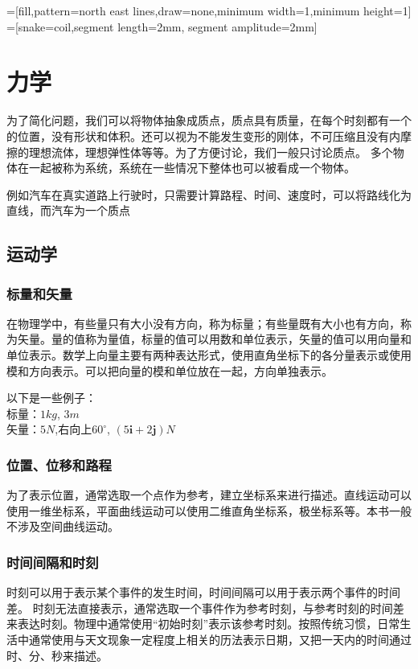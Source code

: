 \usetikzlibrary{snakes, patterns}
=[fill,pattern=north east lines,draw=none,minimum width=1,minimum height=1]
=[snake=coil,segment length=2mm, segment amplitude=2mm]

\part{力学}
为了简化问题，我们可以将物体抽象成质点，质点具有质量，在每个时刻都有一个的位置，没有形状和体积。还可以视为不能发生变形的刚体，不可压缩且没有内摩擦的理想流体，理想弹性体等等。为了方便讨论，我们一般只讨论质点。
多个物体在一起被称为系统，系统在一些情况下整体也可以被看成一个物体。

例如汽车在真实道路上行驶时，只需要计算路程、时间、速度时，可以将路线化为直线，而汽车为一个质点

\chapter{运动学}
\section{标量和矢量}
在物理学中，有些量只有大小没有方向，称为标量；有些量既有大小也有方向，称为矢量。量的值称为量值，标量的值可以用数和单位表示，矢量的值可以用向量和单位表示。数学上向量主要有两种表达形式，使用直角坐标下的各分量表示或使用模和方向表示。可以把向量的模和单位放在一起，方向单独表示。

以下是一些例子： \\
标量：$1kg$, $3m$ \\
矢量：$5N$,右向上$60^\circ$, $(5\bm{i}+2\bm{j})N$ \\

\section{位置、位移和路程}
为了表示位置，通常选取一个点作为参考，建立坐标系来进行描述。直线运动可以使用一维坐标系，平面曲线运动可以使用二维直角坐标系，极坐标系等。本书一般不涉及空间曲线运动。

\section{时间间隔和时刻}
时刻可以用于表示某个事件的发生时间，时间间隔可以用于表示两个事件的时间差。
时刻无法直接表示，通常选取一个事件作为参考时刻，与参考时刻的时间差来表达时刻。物理中通常使用“初始时刻”表示该参考时刻。按照传统习惯，日常生活中通常使用与天文现象一定程度上相关的历法表示日期，又把一天内的时间通过时、分、秒来描述。

